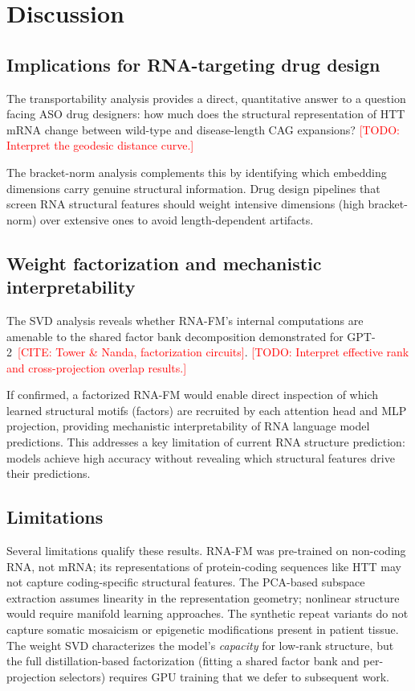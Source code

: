 \documentclass[11pt]{article}
\newcommand{\TODO}[1]{\textcolor{red}{[TODO: #1]}}
\newcommand{\CITE}[1]{\textcolor{red}{[CITE: #1]}}
\begin{document}
\section{Discussion}
\label{sec:discussion}

\subsection{Implications for RNA-targeting drug design}

The transportability analysis provides a direct, quantitative answer to
a question facing ASO drug designers: how much does the structural
representation of HTT mRNA change between wild-type and disease-length
CAG expansions? \TODO{Interpret the geodesic distance curve.}

The bracket-norm analysis complements this by identifying which
embedding dimensions carry genuine structural information. Drug
design pipelines that screen RNA structural features should weight
intensive dimensions (high bracket-norm) over extensive ones to
avoid length-dependent artifacts.

\subsection{Weight factorization and mechanistic interpretability}

The SVD analysis reveals whether RNA-FM's internal computations are
amenable to the shared factor bank decomposition demonstrated for
GPT-2~\CITE{Tower \& Nanda, factorization circuits}. \TODO{Interpret
effective rank and cross-projection overlap results.}

If confirmed, a factorized RNA-FM would enable direct inspection of
which learned structural motifs (factors) are recruited by each
attention head and MLP projection, providing mechanistic interpretability
of RNA language model predictions. This addresses a key limitation
of current RNA structure prediction: models achieve high accuracy
without revealing which structural features drive their predictions.

\subsection{Limitations}

Several limitations qualify these results. RNA-FM was pre-trained
on non-coding RNA, not mRNA; its representations of protein-coding
sequences like HTT may not capture coding-specific structural features.
The PCA-based subspace extraction assumes linearity in the
representation geometry; nonlinear structure would require manifold
learning approaches. The synthetic repeat variants do not capture
somatic mosaicism or epigenetic modifications present in patient
tissue. The weight SVD characterizes the model's \emph{capacity}
for low-rank structure, but the full distillation-based factorization
(fitting a shared factor bank and per-projection selectors) requires
GPU training that we defer to subsequent work.
\end{document}
